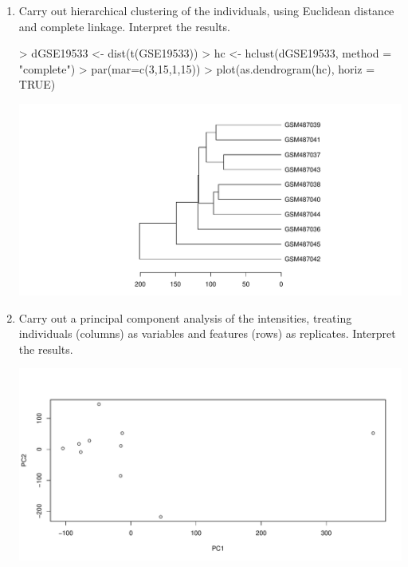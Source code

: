 \documentclass[12pt,a4paper]{paper}
\begin{document}
\begin{enumerate}
\begin{Schunk}
\begin{Sinput}
\end{Sinput}
\end{Schunk}
\begin{enumerate}
\item Carry out hierarchical clustering of the individuals, using Euclidean distance and complete linkage. Interpret the results.
\begin{Schunk}
\begin{Sinput}
> dGSE19533 <- dist(t(GSE19533))
> hc <- hclust(dGSE19533, method = "complete")
> par(mar=c(3,15,1,15))
> plot(as.dendrogram(hc), horiz = TRUE)
\end{Sinput}
\end{Schunk}
\includegraphics{Osorio_Daniel_HW2-007}
\item Carry out a principal component analysis of the intensities, treating individuals (columns)
as variables and features (rows) as replicates. Interpret the results.
\begin{Schunk}
\end{Schunk}
\includegraphics{Osorio_Daniel_HW2-008}

\end{enumerate}
\end{enumerate}
\end{document}
